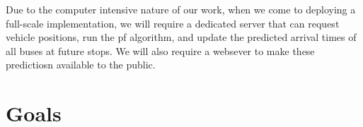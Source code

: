 \documentclass[12pt,a4paper]{article}
\begin{document}
Due to the computer intensive nature of our work, 
when we come to deploying a full-scale implementation,
we will require a dedicated server that can request vehicle positions,
run the \gls{pf} algorithm,
and update the predicted arrival times of all buses at future stops.
We will also require a websever to make these predictiosn available to the public.





\section{Goals}














\end{document}
